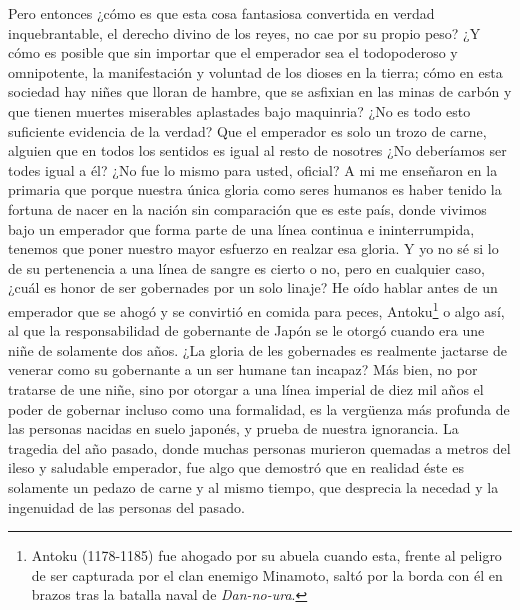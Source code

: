 \documentclass[
]{book}
\begin{document}
Pero entonces ¿cómo es que esta cosa fantasiosa convertida en verdad inquebrantable, el derecho divino de los reyes, no cae por su propio peso? ¿Y cómo es posible que sin importar que el emperador sea el todopoderoso y omnipotente, la manifestación y voluntad de los dioses en la tierra; cómo en esta sociedad hay niñes que lloran de hambre, que se asfixian en las minas de carbón y que tienen muertes miserables aplastades bajo maquinria? ¿No es todo esto suficiente evidencia de la verdad? Que el emperador es solo un trozo de carne, alguien que en todos los sentidos es igual al resto de nosotres ¿No deberíamos ser todes igual a él? ¿No fue lo mismo para usted, oficial? A mi me enseñaron en la primaria que porque nuestra única gloria como seres humanos es haber tenido la fortuna de nacer en la nación sin comparación que es este país, donde vivimos bajo un emperador que forma parte de una línea continua e ininterrumpida, tenemos que poner nuestro mayor esfuerzo en realzar esa gloria. Y yo no sé si lo de su pertenencia a una línea de sangre es cierto o no, pero en cualquier caso, ¿cuál es honor de ser gobernades por un solo linaje? He oído hablar antes de un emperador que se ahogó y se convirtió en comida para peces, Antoku\footnote{Antoku (1178-1185) fue ahogado por su abuela cuando esta, frente al peligro de ser capturada por el clan enemigo Minamoto, saltó por la borda con él en brazos tras la batalla naval de \emph{Dan-no-ura}.} o algo así, al que la responsabilidad de gobernante de Japón se le otorgó cuando era une niñe de solamente dos años. ¿La gloria de les gobernades es realmente jactarse de venerar como su gobernante a un ser humane tan incapaz? Más bien, no por tratarse de une niñe, sino por otorgar a una línea imperial de diez mil años el poder de gobernar incluso como una formalidad, es la vergüenza más profunda de las personas nacidas en suelo japonés, y prueba de nuestra ignorancia.
La tragedia del año pasado, donde muchas personas murieron quemadas a metros del ileso y saludable emperador, fue algo que demostró que en realidad éste es solamente un pedazo de carne y al mismo tiempo, que desprecia la necedad y la ingenuidad de las personas del pasado.
\end{document}
